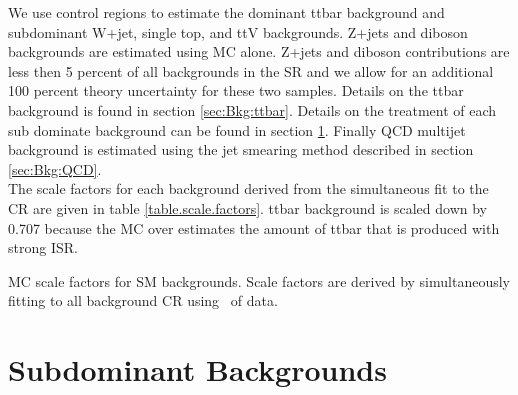 \indent We use control regions to estimate the dominant ttbar background and subdominant W+jet, single top, and ttV backgrounds.  Z+jets and diboson backgrounds are estimated using MC alone.  Z+jets and diboson contributions are less then 5 percent of all backgrounds in the SR and we allow for an additional 100 percent theory uncertainty for these two samples.  Details on the ttbar background is found in section \ref{sec:Bkg:ttbar}. Details on the treatment of each sub dominate background can be found in section \ref{sec:Bkg:sub}. Finally QCD multijet background is estimated using the jet smearing method described in section \ref{sec:Bkg:QCD}. \\

\indent The scale factors for each background derived from the simultaneous fit to the CR are given in table \ref{table.scale.factors}. ttbar background is scaled down by 0.707 because the MC over estimates the amount of ttbar that is produced with strong ISR. \\

\begin{table}
  \begin{center}
    
  \end{center}
  \caption{MC scale factors for SM backgrounds.  Scale factors are derived by simultaneously fitting to all background CR using \intlumi\ \ifb of data.}
  \label{table.scale.factors}
\end{table}



\section{Subdominant Backgrounds}
\label{sec:Bkg:sub}






